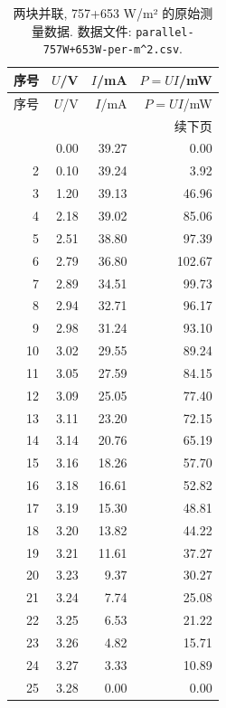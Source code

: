 \documentclass[UTF8,a4paper,11pt]{ctexart}
\begin{document}
\begin{longtable}{rrrr}
\caption{两块并联, 757+653 W/m² 的原始测量数据. 数据文件: \texttt{parallel-757W+653W-per-m\textasciicircum{}2.csv}.}\\
\toprule
序号 & $U$/V & $I$/mA & $P=UI$/mW \\
\midrule
\endfirsthead
\toprule
序号 & $U$/V & $I$/mA & $P=UI$/mW \\
\midrule
\endhead
\midrule
\multicolumn{4}{r}{续下页} \\
\endfoot
\bottomrule
\endlastfoot
1 & 0.00 & 39.27 & 0.00 \\
2 & 0.10 & 39.24 & 3.92 \\
3 & 1.20 & 39.13 & 46.96 \\
4 & 2.18 & 39.02 & 85.06 \\
5 & 2.51 & 38.80 & 97.39 \\
6 & 2.79 & 36.80 & 102.67 \\
7 & 2.89 & 34.51 & 99.73 \\
8 & 2.94 & 32.71 & 96.17 \\
9 & 2.98 & 31.24 & 93.10 \\
10 & 3.02 & 29.55 & 89.24 \\
11 & 3.05 & 27.59 & 84.15 \\
12 & 3.09 & 25.05 & 77.40 \\
13 & 3.11 & 23.20 & 72.15 \\
14 & 3.14 & 20.76 & 65.19 \\
15 & 3.16 & 18.26 & 57.70 \\
16 & 3.18 & 16.61 & 52.82 \\
17 & 3.19 & 15.30 & 48.81 \\
18 & 3.20 & 13.82 & 44.22 \\
19 & 3.21 & 11.61 & 37.27 \\
20 & 3.23 & 9.37 & 30.27 \\
21 & 3.24 & 7.74 & 25.08 \\
22 & 3.25 & 6.53 & 21.22 \\
23 & 3.26 & 4.82 & 15.71 \\
24 & 3.27 & 3.33 & 10.89 \\
25 & 3.28 & 0.00 & 0.00 \\
\end{longtable}
\newpage
\end{document}
